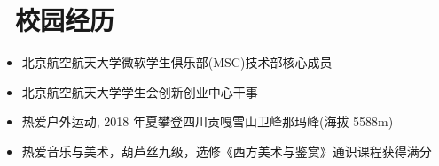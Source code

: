 \documentclass{resume}
\begin{document}
\section{\faUsers\ 校园经历}
\begin{itemize}[parsep=0.5ex]
	\item 北京航空航天大学微软学生俱乐部(MSC)技术部核心成员
	\item 北京航空航天大学学生会创新创业中心干事
	\item 热爱户外运动, 2018 年夏攀登四川贡嘎雪山卫峰那玛峰(海拔 5588m) 
	\item 热爱音乐与美术，葫芦丝九级，选修《西方美术与鉴赏》通识课程获得满分
\end{itemize}
\end{document}

